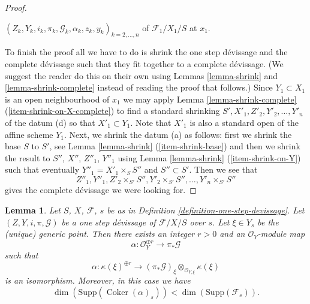 \documentclass{amsart}
\theoremstyle{plain}
\newtheorem{lemma}[subsection]{Lemma}
\theoremstyle{definition}
\theoremstyle{remark}
\numberwithin{equation}{subsection}
\def\Coker{\mathop{\mathrm{Coker}}}
\begin{document}
\begin{proof}
\begin{enumerate}
$(Z_k, Y_k, i_k, \pi_k, \mathcal{G}_k, \alpha_k, z_k, y_k)_{k = 2, \ldots, n}$
of $\mathcal{F}_1/X_1/S$ at $x_1$.
\end{enumerate}
To finish the proof all we have to do is shrink the one step d\'evissage
and the complete d\'evissage such that they fit together to a complete
d\'evissage. (We suggest the reader do this on their own using
Lemmas \ref{lemma-shrink} and
\ref{lemma-shrink-complete}
instead of reading the proof that follows.) Since $Y_1 \subset X_1$
is an open neighbourhood of $x_1$ we may apply
Lemma \ref{lemma-shrink-complete} (\ref{item-shrink-on-X-complete})
to find a standard shrinking $S', X'_1, Z'_2, Y'_2, \ldots, Y'_n$
of the datum (d) so that $X'_1 \subset Y_1$. Note that $X'_1$ is also
a standard open of the affine scheme $Y_1$. Next, we shrink the datum
(a) as follows: first we shrink the base $S$ to $S'$, see
Lemma \ref{lemma-shrink} (\ref{item-shrink-base}) and then
we shrink the result to $S''$, $X''$, $Z''_1$, $Y''_1$ using
Lemma \ref{lemma-shrink} (\ref{item-shrink-on-Y})
such that eventually $Y''_1 = X'_1 \times_S S''$ and $S'' \subset S'$.
Then we see that
$$
Z''_1, Y''_1, Z'_2 \times_{S'} S'', Y'_2 \times_{S'} S'', \ldots,
Y'_n \times_{S'} S''
$$
gives the complete d\'evissage we were looking for.
\end{proof}


\begin{lemma}
\label{lemma-existence-alpha}
Let $S$, $X$, $\mathcal{F}$, $s$ be as in
Definition \ref{definition-one-step-devissage}.
Let $(Z, Y, i, \pi, \mathcal{G})$ be a one step d\'evissage
of $\mathcal{F}/X/S$ over $s$.
Let $\xi \in Y_s$ be the (unique) generic point.
Then there exists an integer $r > 0$ and an $\mathcal{O}_Y$-module map
$$
\alpha : \mathcal{O}_Y^{\oplus r} \longrightarrow \pi_*\mathcal{G}
$$
such that
$$
\alpha :
\kappa(\xi)^{\oplus r}
\longrightarrow
(\pi_*\mathcal{G})_\xi \otimes_{\mathcal{O}_{Y, \xi}} \kappa(\xi)
$$
is an isomorphism. Moreover, in this case we have
$$
\dim(\text{Supp}(\Coker(\alpha)_s)) < \dim(\text{Supp}(\mathcal{F}_s)).
$$
\end{lemma}
\end{document}
